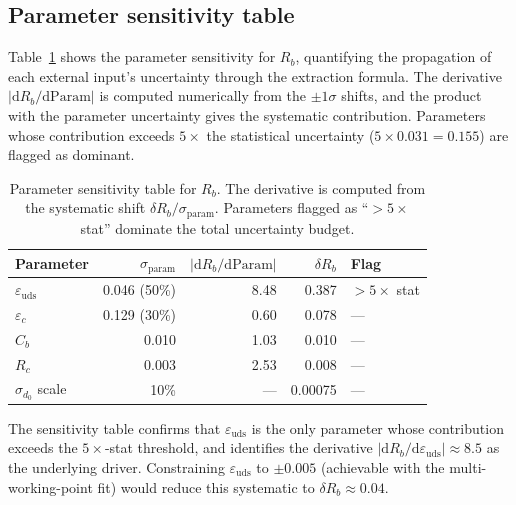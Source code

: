 \documentclass[11pt,a4paper]{article}
\begin{document}
\subsection{Parameter sensitivity table}
\label{sec:sensitivity}

Table~\ref{tab:sensitivity} shows the parameter sensitivity for $R_b$,
quantifying the propagation of each external input's uncertainty through the
extraction formula. The derivative $|\mathrm{d}R_b/\mathrm{d}\mathrm{Param}|$ is
computed numerically from the $\pm 1\sigma$ shifts, and the product with the
parameter uncertainty gives the systematic contribution. Parameters whose
contribution exceeds $5\times$ the statistical uncertainty ($5 \times 0.031 = 0.155$)
are flagged as dominant.

\begin{table}[htbp]
\centering
\caption{Parameter sensitivity table for $R_b$. The derivative is computed from the
systematic shift $\delta R_b / \sigma_\mathrm{param}$. Parameters flagged as
``$> 5\times$ stat'' dominate the total uncertainty budget.}
\label{tab:sensitivity}
\small
\begin{tabular}{lrrrl}
\toprule
Parameter & $\sigma_\mathrm{param}$ & $|\mathrm{d}R_b/\mathrm{d}\mathrm{Param}|$ & $\delta R_b$ & Flag \\
\midrule
$\varepsilon_\mathrm{uds}$ & 0.046 (50\%) & 8.48 & 0.387 & $> 5\times$ stat \\
$\varepsilon_c$ & 0.129 (30\%) & 0.60 & 0.078 & --- \\
$C_b$ & 0.010 & 1.03 & 0.010 & --- \\
$R_c$ & 0.003 & 2.53 & 0.008 & --- \\
$\sigma_{d_0}$ scale & 10\% & --- & 0.00075 & --- \\
\bottomrule
\end{tabular}
\end{table}

The sensitivity table confirms that $\varepsilon_\mathrm{uds}$ is the only parameter
whose contribution exceeds the $5\times$-stat threshold, and identifies the derivative
$|\mathrm{d}R_b/\mathrm{d}\varepsilon_\mathrm{uds}| \approx 8.5$ as the underlying
driver. Constraining $\varepsilon_\mathrm{uds}$ to $\pm 0.005$ (achievable with the
multi-working-point fit) would reduce this systematic to $\delta R_b \approx 0.04$.

\FloatBarrier
{}
\end{document}
